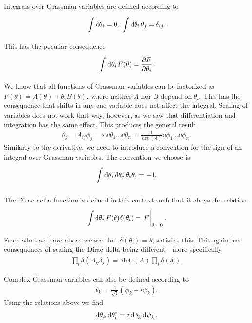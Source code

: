 Integrals over Grassman variables are defined according to
\begin{align*}
	\int\limits_{}^{}\dd{\theta_{i}} = 0,\ \int\limits_{}^{}\dd{\theta_{i}}\theta_{j} = \delta_{ij}.
\end{align*}
This has the peculiar consequence
\begin{align*}
	\int\limits_{}^{}\dd{\theta_{i}}F(\theta) = \pdv{F}{\theta_{i}}.
\end{align*}
We know that all functions of Grassman variables can be factorized as $F(\theta) = A(\theta) + \theta_{i}B(\theta)$, where neither $A$ nor $B$ depend on $\theta_{i}$. This has the consequence that shifts in any one variable does not affect the integral. Scaling of variables does not work that way, however, as we saw that differentiation and integration has the same effect. This produces the general result
\begin{align*}
	\theta_{j} = A_{ij}\phi_{j}\implies \dd{\theta}_{1}\dots\dd{\theta}_{n} = \frac{1}{\det(A)}\dd{\phi}_{1}\dots\dd{\phi}_{n}.
\end{align*}
Similarly to the derivative, we need to introduce a convention for the sign of an integral over Grassman variables. The convention we choose is
\begin{align*}
	\int\limits_{}^{}\dd{\theta_{i}}\dd{\theta_{j}}\theta_{i}\theta_{j} = -1.
\end{align*}

The Dirac delta function is defined in this context such that it obeys the relation
\begin{align*}
	\inte{}{}\dd{\theta}_{i}F(\theta)\delta(\theta_{i}) = \eval{F}_{\theta_{i} = 0}.
\end{align*}
From what we have above we see that $\delta(\theta_{i}) = \theta_{i}$ satisfies this. This again has consequences of scaling the Dirac delta being different - more specifically
\begin{align*}
	\prod\limits_{i}\delta(A_{ij}\delta_{j}) = \det(A)\prod\limits_{i}\delta(\delta_{i}).
\end{align*}

Complex Grassman variables can also be defined according to
\begin{align*}
	\theta_{k} = \frac{1}{\sqrt{2}}(\phi_{k} + i\psi_{k}).
\end{align*}
Using the relations above we find
\begin{align*}
	\dd{\theta}_{k}\dd{\theta}_{k}^{\star} = i\dd{\phi}_{k}\dd{\psi}_{k}.
\end{align*}


